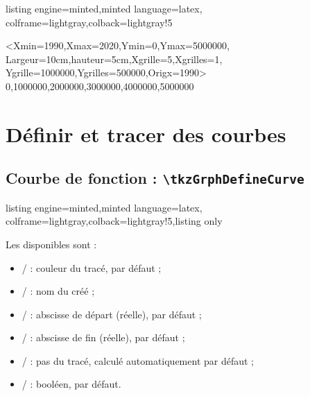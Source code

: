 \documentclass[11pt,a4paper]{ltxdoc}
\begin{document}
\begin{tcblisting}{listing engine=minted,minted language=latex,
  colframe=lightgray,colback=lightgray!5}
\begin{tkzGrph}%
    <Xmin=1990,Xmax=2020,Ymin=0,Ymax=5000000,
    Largeur=10cm,hauteur=5cm,Xgrille=5,Xgrilles=1,
    Ygrille=1000000,Ygrilles=500000,Origx=1990>
    {0,1000000,2000000,3000000,4000000,5000000}
\end{tkzGrph}
\end{tcblisting}

\pagebreak

\section{Définir et tracer des courbes}

\subsection{Courbe de fonction : \texttt{\textbackslash tkzGrphDefineCurve}}

\begin{tcblisting}{listing engine=minted,minted language=latex,
  colframe=lightgray,colback=lightgray!5,listing only}
\end{tcblisting}

Les \MontreCode{[clés]} disponibles sont :

\begin{itemize}
	\item {} /  : couleur du tracé,  par défaut ;
	\item {} /  : nom du  créé ;
	\item {} /  : abscisse de départ (réelle),  par défaut ;
	\item {} /  : abscisse de fin (réelle),  par défaut ;
	\item {} /  : pas du tracé, calculé automatiquement par défaut ;
	\item {} /  : booléen,  par défaut.
\end{itemize}
\end{document}
